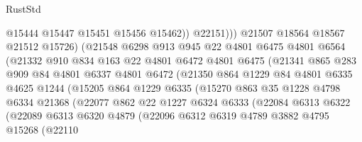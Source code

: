 \begin{lexlean}{RustStd}
\begin{coremodule}
                              @15444
                              @15447
                              @15451
                              @15456
                              @15462))
                          @22151)))
                    @21507
                    @18564
                    @18567
                    @21512
                    @15726)
                  (@21548
                    @6298
                    @913
                    @945
                    @22
                    @4801
                    @6475
                    @4801
                    @6564
                    (@21332
                      @910
                      @834
                      @163
                      @22
                      @4801
                      @6472
                      @4801
                      @6475
                      (@21341
                        @865
                        @283
                        @909
                        @84
                        @4801
                        @6337
                        @4801
                        @6472
                        (@21350
                          @864
                          @1229
                          @84
                          @4801
                          @6335
                          @4625
                          @1244
                          (@15205
                            @864
                            @1229
                            @6335
                            (@15270
                              @863
                              @35
                              @1228
                              @4798
                              @6334
                              @21368
                              (@22077
                                @862
                                @22
                                @1227
                                @6324
                                @6333
                                (@22084
                                  @6313
                                  @6322
                                  (@22089
                                    @6313
                                    @6320
                                    @4879
                                    (@22096
                                      @6312
                                      @6319
                                      @4789
                                      @3882
                                      @4795
                                      @15268
                                      (@22110

\end{coremodule}
\end{lexlean}
